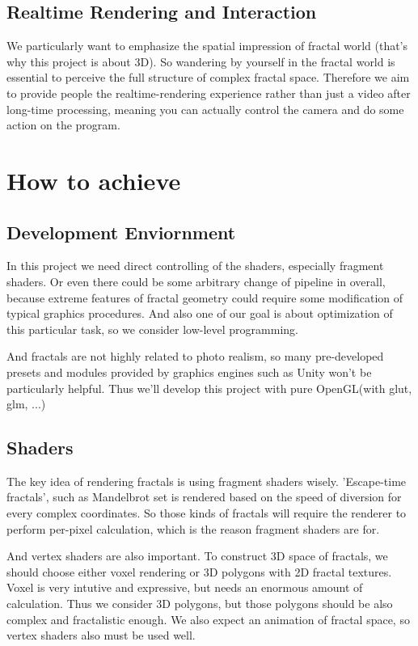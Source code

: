 \documentclass[a4paper]{article}
\begin{document}
\subsection{Realtime Rendering and Interaction}
We particularly want to emphasize the spatial impression of fractal world (that's why this project is about 3D).
So wandering by yourself in the fractal world is essential to perceive the full structure of complex fractal space.
Therefore we aim to provide people the realtime-rendering experience rather than just a video after long-time processing,
meaning you can actually control the camera and do some action on the program.
\section{How to achieve}
\subsection{Development Enviornment}
In this project we need direct controlling of the shaders, especially fragment shaders.
Or even there could be some arbitrary change of pipeline in overall, because extreme features of fractal geometry could require some modification of typical graphics procedures.
And also one of our goal is about optimization of this particular task, so we consider low-level programming.

And fractals are not highly related to photo realism, so many pre-developed presets and modules provided by
graphics engines such as Unity won't be particularly helpful.
Thus we'll develop this project with pure OpenGL(with glut, glm, ...)
\subsection{Shaders}
The key idea of rendering fractals is using fragment shaders wisely.
'Escape-time fractals', such as Mandelbrot set is rendered based on the speed of diversion for every complex coordinates.
So those kinds of fractals will require the renderer to perform per-pixel calculation, which is the reason fragment shaders are for.

And vertex shaders are also important.
To construct 3D space of fractals, we should choose either voxel rendering or 3D polygons with 2D fractal textures.
Voxel is very intutive and expressive, but needs an enormous amount of calculation.
Thus we consider 3D polygons, but those polygons should be also complex and fractalistic enough.
We also expect an animation of fractal space, so vertex shaders also must be used well.
\end{document}
